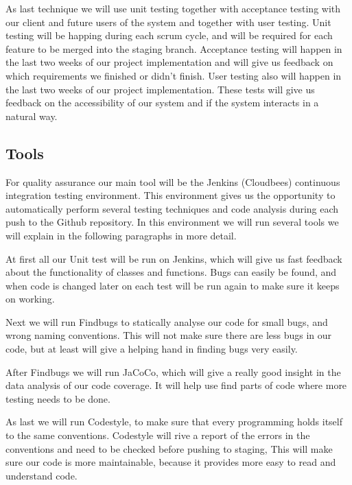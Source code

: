 As last technique we will use unit testing together with acceptance testing with our client and future users of the system and together with user testing.
Unit testing will be happing during each scrum cycle, and will be required for each feature to be merged into the staging branch.
Acceptance testing will happen in the last two weeks of our project implementation and will give us feedback on which requirements we finished or didn't finish.
User testing also will happen in the last two weeks of our project implementation.
These tests will give us feedback on the accessibility of our system and if the system interacts in a natural way.

\subsection*{Tools}
For quality assurance our main tool will be the Jenkins (Cloudbees) continuous integration testing environment.
This environment gives us the opportunity to automatically perform several testing techniques and code analysis during each push to the Github repository.
In this environment we will run several tools we will explain in the following paragraphs in more detail.

At first all our Unit test will be run on Jenkins, which will give us fast feedback about the functionality of classes and functions.
Bugs can easily be found, and when code is changed later on each test will be run again to make sure it keeps on working.

Next we will run Findbugs to statically analyse our code for small bugs, and wrong naming conventions.
This will not make sure there are less bugs in our code, but at least will give a helping hand in finding bugs very easily.

After Findbugs we will run JaCoCo, which will give a really good insight in the data analysis of our code coverage.
It will help use find parts of code where more testing needs to be done.

As last we will run Codestyle, to make sure that every programming holds itself to the same conventions.
Codestyle will rive a report of the errors in the conventions and need to be checked before pushing to staging,
This will make sure our code is more maintainable, because it provides more easy to read and understand code.